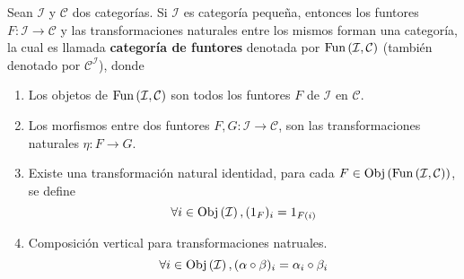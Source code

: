 \documentclass[12pt]{report}
\newcounter{it}
\theoremstyle{largebreak}
\newcommand\cf[3]{\ensuremath{#1:#2\rightarrow#3}}
\newcommand{\Obj}[1]{\ensuremath{\textup{Obj}\left(#1\right)}}
\newcommand{\Fun}[2]{\ensuremath{\textup{Fun}\left(#1,#2\right)}}
\begin{document}
    \begin{propo}
        Sean $\mathcal{I}$ y $\mathcal{C}$ dos categorías. Si $\mathcal{I}$ es categoría pequeña, entonces los funtores $\cf{F}{\mathcal{I}}{\mathcal{C}}$ y las transformaciones naturales entre los mismos forman una categoría, la cual es llamada \textbf{categoría de funtores} denotada por $\Fun{\mathcal{I}}{\mathcal{C}}$ (también denotado por $\mathcal{C}^{\mathcal{I}}$), donde
        \begin{enumerate}
            \item Los objetos de $\Fun{\mathcal{I}}{\mathcal{C}}$ son todos los funtores $F$ de $\mathcal{I}$ en $\mathcal{C}$.
            \item Los morfismos entre dos funtores $\cf{F,G}{\mathcal{I}}{\mathcal{C}}$, son las transformaciones naturales $\cf{\eta}{F}{G}$.
            \item Existe una transformación natural identidad, para cada $F\in\Obj{\Fun{\mathcal{I}}{\mathcal{C}}}$, se define
            \begin{equation*}
                \forall i\in\Obj{\mathcal{I}}, (1_F)_i=1_{F(i)}
            \end{equation*}
            \item Composición vertical para transformaciones natruales.
            \begin{equation*}
                \forall i\in\Obj{\mathcal{I}}, (\alpha\circ\beta)_i=\alpha_i\circ\beta_i
            \end{equation*}
        \end{enumerate}
    \end{propo}
\end{document}
